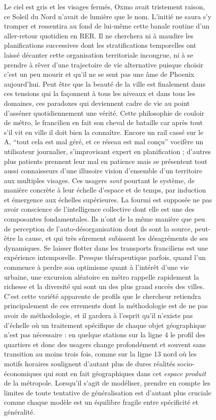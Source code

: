 \begin{figure}[h!]
\begin{mdframed}
Le ciel est gris et les visages fermés, Oxmo avait tristement raison, ce Soleil du Nord n'avait de lumière que le nom. L'initié ne saura s'y tromper et ressentira au fond de lui-même cette banale routine d'un aller-retour quotidien en RER. Il ne cherchera ni à maudire les planifications successives dont les stratifications temporelles ont laissé décanter cette organisation territoriale incongrue, ni à se prendre à rêver d'une trajectoire de vie alternative puisque choisir c'est un peu mourir et qu'il ne se sent pas une âme de Phoenix aujourd'hui. Peut être que la beauté de la ville est finalement dans ces tensions qui la façonnent à tous les niveaux et dans tous les domaines, ces paradoxes qui deviennent cadre de vie au point d'asséner quotidiennement une vérité. Cette philosophie de couloir de métro, le francilien en fait son cheval de bataille car après tout s'il vit en ville il doit bien la connaître. Encore un rail cassé sur le A, ``tout cela est mal géré, et ce réseau est mal conçu'' vocifère un utilisateur journalier, s'improvisant expert en planification ; d'autres plus patients prennent leur mal en patience mais se présentent tout aussi connaisseurs d'une illusoire vision d'ensemble d'un territoire aux multiples visages. Ces usagers \emph{sont} pourtant le système, de manière concrète à leur échelle d'espace et de temps, par induction et émergence aux échelles supérieures. La fourmi est supposée ne pas avoir conscience de l'intelligence collective dont elle est une des composantes fondamentales. Ils n'ont de la même manière que peu de perception de l'auto-désorganisation dont ils sont la source, peut-être la cause, et qui très sûrement subissent les désagréments de ses dynamiques. Se laisser flotter dans les transports franciliens est une expérience intemporelle. Presque thérapeutique parfois, quand l'un commence à perdre son optimisme quant à l'intérêt d'une vie urbaine, une excursion aléatoire en métro rappelle rapidement la richesse et la diversité qui sont un des plus grand succès des villes. C'est cette variété apparente de profils que le chercheur retiendra principalement de ces errements dont la méthodologie est de ne pas avoir de méthodologie, et il gardera à l'esprit qu'il n'existe pas d'échelle où un traitement spécifique de chaque objet géographique n'est pas nécessaire : en quelque stations sur la ligne 4 le profil des quartiers et donc des usagers change profondément et souvent sans transition au moins trois fois, comme sur la ligne 13 nord où les motifs horaires soulignent d'autant plus de dures réalités socio-économiques qui sont en fait géographiques dans cet \emph{espace produit} de la métropole. Lorsqu'il s'agit de modéliser, prendre en compte les limites de toute tentative de généralisation est d'autant plus cruciale comme chaque modèle est un équilibre fragile entre spécificité et généralité.


\end{mdframed}
\end{figure}
